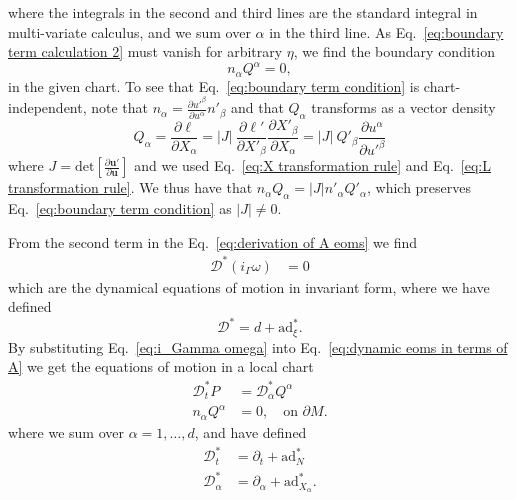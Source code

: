 where the integrals in the second and third lines are the standard integral in multi-variate calculus, and we sum over $\alpha$ in the third line. As Eq.~\ref{eq:boundary term calculation 2} must vanish for arbitrary $\eta$, we find the boundary condition
\begin{equation} \label{eq:boundary term condition}
n_\alpha Q^\alpha = 0,
\end{equation}
in the given chart. To see that Eq.~\ref{eq:boundary term condition} is chart-independent, note that $n_\alpha = \frac{\partial u'^\beta}{\partial u^\alpha} n'_\beta$ and that $Q_\alpha$ transforms as a vector density
\begin{equation}
Q_\alpha  = \frac{\partial \ell}{\partial X_\alpha} =   |J|\  \frac{\partial \ell'}{\partial X'_\beta}  \frac{\partial X'_\beta}{\partial X_\alpha}  = |J|\ Q'_\beta \frac{\partial u^\alpha}{\partial u'^\beta}
\end{equation}
where $J = \text{det} \left[ \frac{\partial \mathbf{u}' }{ \partial \mathbf{u} } \right] $ and we used Eq.~\ref{eq:X transformation rule} and Eq.~\ref{eq:L transformation rule}. We thus have that $n_\alpha Q_\alpha = |J| n'_\alpha Q'_\alpha$, which preserves Eq.~\ref{eq:boundary term condition} as $|J| \neq 0$.

From the second term in the Eq.~\ref{eq:derivation of A eoms} we find
\begin{subequations} \label{eq:dynamic eoms in terms of A}
\begin{align}
\mathcal{D}^* (i_\Gamma \omega) & = 0 
\end{align}
\end{subequations}
which are the dynamical equations of motion in invariant form, where we have defined
\begin{equation}
\mathcal{D}^* = d + \text{ad}_\xi^*.
\end{equation}
By substituting Eq.~\ref{eq:i_Gamma omega} into Eq.~\ref{eq:dynamic eoms in terms of A} we get the equations of motion in a local chart
\begin{subequations} \label{eq:dynamic eoms in terms of P and Q}
\begin{align}
\mathcal{D}^*_t P & =  \mathcal{D}^*_\alpha Q^\alpha \\
n_\alpha Q^\alpha & = 0, \quad \text{on } \partial M \label{eq:Q boundary condition}.
\end{align}
\end{subequations}
where we sum over $\alpha = 1, \dots, d$, and have defined
\begin{subequations}
\begin{align}
\mathcal{D}^*_t & = \partial_t + \text{ad}_N^* \\
\mathcal{D}^*_\alpha & = \partial_\alpha + \text{ad}_{X_\alpha}^*.
\end{align}
\end{subequations}





